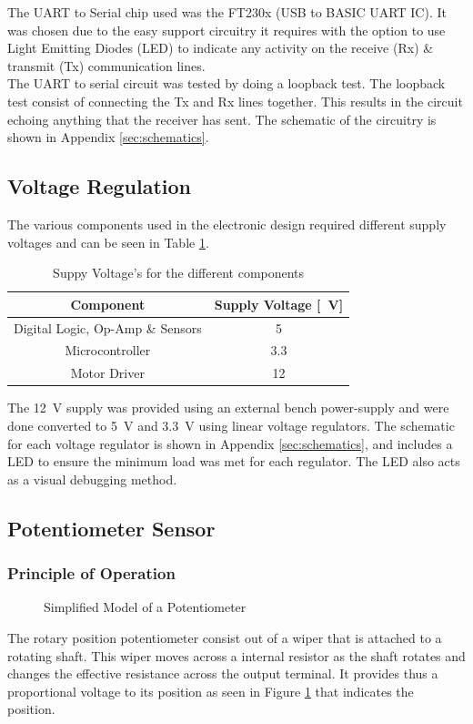 The UART to Serial chip used was the FT230x (USB to BASIC UART IC). It was chosen due to the easy support circuitry it requires with the option to use Light Emitting Diodes (LED) to indicate any activity on the receive (Rx)  \& transmit (Tx) communication lines.\\

The UART to serial circuit was tested by doing a loopback test. The loopback test consist of connecting the Tx and Rx lines together. This results in the circuit echoing anything that the receiver has sent. The schematic of the circuitry is shown in Appendix \ref{sec:schematics}.


\subsection{Voltage Regulation}

The various components used in the electronic design required different supply voltages and can be seen in Table \ref{table:supplyVoltage}.\\


\begin{table}[]
	\centering
	\begin{tabular}{|c|c|}
		\hline
		Component & Supply Voltage [\SI{}{V}] \\
		\hline
		\hline
		Digital Logic, Op-Amp \& Sensors & \SI{5}{} \\
		\hline
		Microcontroller & \SI{3.3}{} \\
		\hline
		Motor Driver & \SI{12}{} \\
		\hline
	\end{tabular}
	\caption{Suppy Voltage's for the different components}
	\label{table:supplyVoltage}
\end{table}

The \SI{12}{\volt} supply was provided using an external bench power-supply and were done converted to \SI{5}{V} and \SI{3.3}{V} using linear voltage regulators. The schematic for each voltage regulator is shown in Appendix \ref{sec:schematics}, and includes a LED to ensure the minimum load was met for each regulator. The LED also acts as a visual debugging method.

\subsection{Potentiometer Sensor}
\subsubsection{Principle of Operation}
\begin{figure}[h]
	\centering
	
	\caption{Simplified Model of a Potentiometer}
	\label{fig:potentiometer}
\end{figure}
The rotary position potentiometer consist out of a wiper that is attached to a rotating shaft. This wiper moves across a internal resistor as the shaft rotates and changes the effective resistance across the output terminal. It provides thus a proportional voltage to its position as seen in Figure \ref{fig:potentiometer} that indicates the position.

